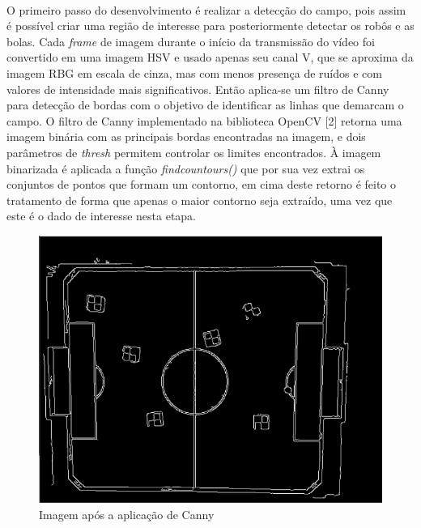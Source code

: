 \documentclass[conference, harvard, brazil, english]{sbatex}
\begin{document}
		\paragraph{}
		O primeiro passo do desenvolvimento é realizar a detecção do campo, pois assim é possível criar uma região de interesse para posteriormente detectar os robôs e as bolas. Cada \textit{frame} de imagem durante o início da transmissão do vídeo foi convertido em uma imagem HSV e usado apenas seu canal V, que se aproxima da imagem RBG em escala de cinza, mas com menos presença de ruídos e com valores de intensidade mais significativos. Então aplica-se um filtro de Canny para detecção de bordas com o objetivo de identificar as linhas que demarcam o campo. O filtro de Canny implementado na biblioteca OpenCV [2] retorna uma imagem binária com as principais bordas encontradas na imagem, e dois parâmetros de \textit{thresh} permitem controlar os limites encontrados. À imagem binarizada é aplicada a função \textit{findcountours()} que por sua vez extrai os conjuntos de pontos que formam um contorno, em cima deste retorno é feito o tratamento de forma que apenas o maior contorno seja extraído, uma vez que este é o dado de interesse nesta etapa.
		\begin{figure}[h]
			\centering
			\includegraphics[scale=0.3]{canny}
			\caption{Imagem após a aplicação de Canny}
		\end{figure}
\end{document}
